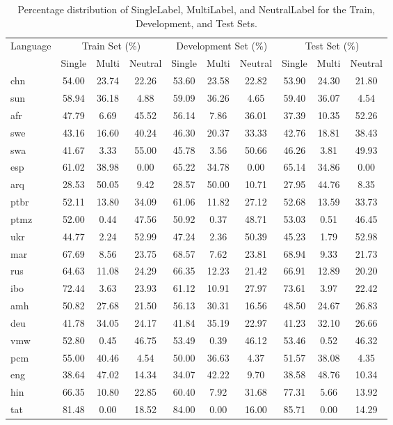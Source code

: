 \begin{table*}[htbp]
    \centering
    \begin{tabular}{lccc|ccc|ccc}
        \hline
        \multirow{2}{*}{Language} & \multicolumn{3}{c|}{Train Set (\%)} & \multicolumn{3}{c|}{Development Set (\%)} & \multicolumn{3}{c}{Test Set (\%)} \\
        & Single & Multi & Neutral & Single & Multi & Neutral & Single & Multi & Neutral \\
        \hline
        chn & 54.00 & 23.74 & 22.26 & 53.60 & 23.58 & 22.82 & 53.90 & 24.30 & 21.80 \\
        sun & 58.94 & 36.18 & 4.88 & 59.09 & 36.26 & 4.65 & 59.40 & 36.07 & 4.54 \\
        afr & 47.79 & 6.69 & 45.52 & 56.14 & 7.86 & 36.01 & 37.39 & 10.35 & 52.26 \\
        swe & 43.16 & 16.60 & 40.24 & 46.30 & 20.37 & 33.33 & 42.76 & 18.81 & 38.43 \\
        swa & 41.67 & 3.33 & 55.00 & 45.78 & 3.56 & 50.66 & 46.26 & 3.81 & 49.93 \\
        esp & 61.02 & 38.98 & 0.00 & 65.22 & 34.78 & 0.00 & 65.14 & 34.86 & 0.00 \\
        arq & 28.53 & 50.05 & 9.42 & 28.57 & 50.00 & 10.71 & 27.95 & 44.76 & 8.35 \\
        ptbr & 52.11 & 13.80 & 34.09 & 61.06 & 11.82 & 27.12 & 52.68 & 13.59 & 33.73 \\
        ptmz & 52.00 & 0.44 & 47.56 & 50.92 & 0.37 & 48.71 & 53.03 & 0.51 & 46.45 \\
        ukr & 44.77 & 2.24 & 52.99 & 47.24 & 2.36 & 50.39 & 45.23 & 1.79 & 52.98 \\
        mar & 67.69 & 8.56 & 23.75 & 68.57 & 7.62 & 23.81 & 68.94 & 9.33 & 21.73 \\
        rus & 64.63 & 11.08 & 24.29 & 66.35 & 12.23 & 21.42 & 66.91 & 12.89 & 20.20 \\
        ibo & 72.44 & 3.63 & 23.93 & 61.12 & 10.91 & 27.97 & 73.61 & 3.97 & 22.42 \\
        amh & 50.82 & 27.68 & 21.50 & 56.13 & 30.31 & 16.56 & 48.50 & 24.67 & 26.83 \\
        deu & 41.78 & 34.05 & 24.17 & 41.84 & 35.19 & 22.97 & 41.23 & 32.10 & 26.66 \\
        vmw & 52.80 & 0.45 & 46.75 & 53.49 & 0.39 & 46.12 & 53.46 & 0.52 & 46.32 \\
        pcm & 55.00 & 40.46 & 4.54 & 50.00 & 36.63 & 4.37 & 51.57 & 38.08 & 4.35 \\
        eng & 38.64 & 47.02 & 14.34 & 34.07 & 42.22 & 9.70 & 38.58 & 48.76 & 10.34 \\
        hin & 66.35 & 10.80 & 22.85 & 60.40 & 7.92 & 31.68 & 77.31 & 5.66 & 13.92 \\
        tat & 81.48 & 0.00 & 18.52 & 84.00 & 0.00 & 16.00 & 85.71 & 0.00 & 14.29 \\
        \hline
    \end{tabular}
    \caption{Percentage distribution of SingleLabel, MultiLabel, and NeutralLabel for the Train, Development, and Test Sets.}
    \label{tab:all_sets_label_percentage}
\end{table*}


